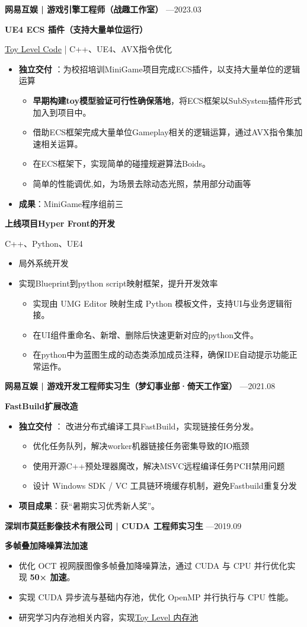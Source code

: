 \documentclass[10pt,a4paper]{article}
\newcommand{\company}[2]{
    \par \vspace{10pt}
    {\fontsize{11}{11}\selectfont\bfseries #1}
    \hfill
    {\color{muted}\fontsize{10}{10}\selectfont #2}
    \par}
\newcommand{\project}[1]{
    \par
    \vspace{5pt}
    {\fontsize{10}{10}\selectfont \bfseries \hspace{10pt} #1}
    \par}
\newcommand{\meta}[1]{
    \par
    \vspace{-5pt}
    {\color{muted}\fontsize{10}{10}\selectfont \hspace{10pt} #1}
    \par}
\begin{document}
\company{网易互娱 | 游戏引擎工程师（战趣工作室）}{2022.07—2023.03}
\project{\textbf{UE4 ECS 插件（支持大量单位运行）}}
\meta{\href{https://github.com/liaoKM/AvxBitmapECS/tree/master}{Toy Level Code} | C++、UE4、AVX指令优化}
\begin{itemize}
\item \textbf{独立交付} ：为校招培训MiniGame项目完成ECS插件，以支持大量单位的逻辑运算
\begin{itemize}
\item \textbf{早期构建toy模型验证可行性确保落地}，将ECS框架以SubSystem插件形式加入到项目中。
\item 借助ECS框架完成大量单位Gameplay相关的逻辑运算，通过AVX指令集加速相关运算。
\item 在ECS框架下，实现简单的碰撞规避算法Boids。
\item 简单的性能调优,如，为场景去除动态光照，禁用部分动画等
\end{itemize}
\item \textbf{成果}：MiniGame程序组前三
\end{itemize}
\project{\textbf{上线项目Hyper Front的开发}}
\meta{C++、Python、UE4}
\begin{itemize}
\item 局外系统开发
\item 实现Blueprint到python script映射框架，提升开发效率
\begin{itemize}
\item 实现由 UMG Editor 映射生成 Python 模板文件，支持UI与业务逻辑衔接。
\item 在UI组件重命名、新增、删除后快速更新对应的python文件。
\item 在python中为蓝图生成的动态类添加成员注释，确保IDE自动提示功能正常运作。
\end{itemize}
\end{itemize}
\company{网易互娱 | 游戏开发工程师实习生（梦幻事业部·倚天工作室）}{2021.07—2021.08}
\project{\textbf{FastBuild扩展改造}}
\begin{itemize}
\item \textbf{独立交付} ： 改进分布式编译工具FastBuild，实现链接任务分发。
\begin{itemize}
\item 优化任务队列，解决worker机器链接任务密集导致的IO瓶颈
\item 使用开源C++预处理器魔改，解决MSVC远程编译任务PCH禁用问题
\item 设计 Windows SDK / VC 工具链环境缓存机制，避免Fastbuild重复分发
\end{itemize}
\item \textbf{项目成果}：获“暑期实习优秀新人奖”。
\end{itemize}
\company{深圳市莫廷影像技术有限公司 | CUDA 工程师实习生}{2018.11—2019.09}
\project{多帧叠加降噪算法加速}
\begin{itemize}
\item 优化 OCT 视网膜图像多帧叠加降噪算法，通过 CUDA 与 CPU 并行优化实现 \textbf{50× 加速}。
\item 实现 CUDA 异步流与基础内存池，优化 OpenMP 并行执行与 CPU 性能。
\item 研究学习内存池相关内容，实现\href{https://github.com/liaoKM/myMalloc}{Toy Level 内存池}
\end{itemize}
\end{document}
